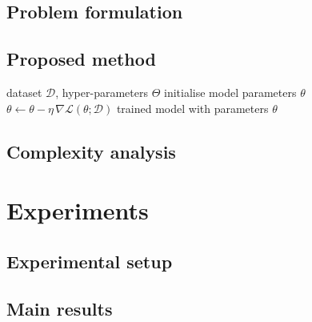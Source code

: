 \documentclass[11pt,a4paper]{article}
\begin{document}
\subsection{Problem formulation}

\subsection{Proposed method}

\begin{algorithm}[t]
\caption{Outline of the proposed method}
\label{alg:method}
\begin{algorithmic}[1]
\REQUIRE dataset $\mathcal{D}$, hyper-parameters $\Theta$
\STATE initialise model parameters $\theta$
    \STATE $\theta \leftarrow \theta - \eta \,\nabla \mathcal{L}(\theta;\mathcal{D})$
\ENDWHILE
\RETURN trained model with parameters $\theta$
\end{algorithmic}
\end{algorithm}

\subsection{Complexity analysis}

\section{Experiments}
\label{sec:experiments}

\subsection{Experimental setup}

\subsection{Main results}
\end{document}
